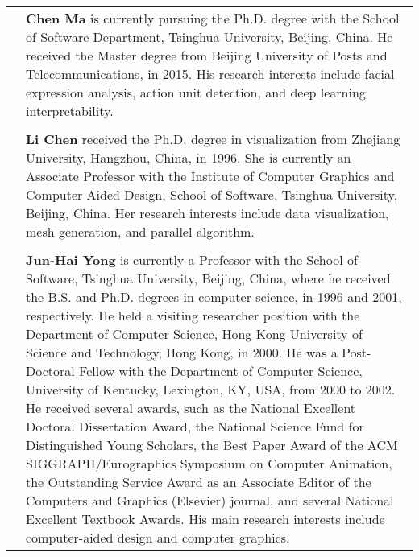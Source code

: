 \documentclass[5p,twocolumn]{elsarticle}
\begin{document}
\begin{table}[htp!]
	\scriptsize
	\begin{tabular}{cp{6cm}}
		\raisebox{-0.9\height}{\texttt{[image: figure/author/ChenMa.png]}} & \textbf{Chen Ma} is currently pursuing the Ph.D. degree with the School of Software Department, Tsinghua University, Beijing, China. He received the Master degree from Beijing University of Posts and Telecommunications, in 2015. His research interests include facial expression analysis, action unit detection, and deep learning interpretability. \\
		& \\
		\raisebox{-0.9\height}{\texttt{[image: figure/author/LiChen.png]}} & \textbf{Li Chen} received the Ph.D. degree in visualization from Zhejiang University, Hangzhou, China, in 1996. She is currently an Associate Professor with the Institute of Computer Graphics and Computer Aided Design, School of Software, Tsinghua University, Beijing, China. Her research interests include data visualization, mesh generation, and parallel algorithm. \\
		& \\
		\raisebox{-0.9\height}{\includegraphics [width=0.15\textwidth]{figure/author/JunhaiYong.png}}
		&
		\textbf{Jun-Hai Yong} is currently a Professor with the School of Software, Tsinghua University, Beijing, China, where he received the B.S. and Ph.D. degrees in computer science, in 1996 and 2001, respectively. He held a visiting researcher position with the Department of Computer Science, Hong Kong University of Science and Technology, Hong Kong, in 2000. He was a Post-Doctoral Fellow with the Department of Computer Science, University of Kentucky, Lexington, KY, USA, from 2000 to 2002.
		He received several awards, such as the National Excellent Doctoral Dissertation Award, the National Science Fund for Distinguished Young Scholars, the Best Paper Award of the ACM SIGGRAPH/Eurographics Symposium on Computer Animation, the Outstanding Service Award as an Associate Editor of the Computers and Graphics (Elsevier) journal, and several National Excellent Textbook Awards. His main research interests include computer-aided design and computer graphics. \\

	\end{tabular}

\end{table}
\end{document}
